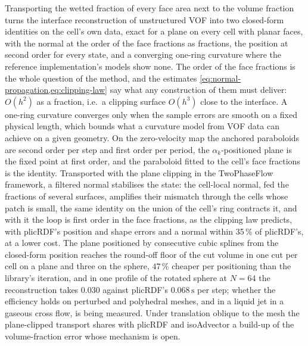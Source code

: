 \documentclass[preprint,12pt]{elsarticle}
\begin{document}
Transporting the wetted fraction of every face area next to the volume fraction turns the interface reconstruction of unstructured VOF into two closed-form identities on the cell's own data, exact for a plane on every cell with planar faces, with the normal at the order of the face fractions as fractions, the position at second order for every state, and a converging one-ring curvature where the reference implementation's models show none. The order of the face fractions is the whole question of the method, and the estimates \cref{eq:normal-propagation,eq:clipping-law} say what any construction of them must deliver: $O(h^2)$ as a fraction, i.e.\ a clipping surface $O(h^3)$ close to the interface. A one-ring curvature converges only when the sample errors are smooth on a fixed physical length, which bounds what a curvature model from VOF data can achieve on a given geometry. On the zero-velocity map the anchored paraboloids are second order per step and first order per period, the $\alpha_k$-positioned plane is the fixed point at first order, and the paraboloid fitted to the cell's face fractions is the identity. Transported with the plane clipping in the TwoPhaseFlow framework, a filtered normal stabilises the state: the cell-local normal, fed the fractions of several surfaces, amplifies their mismatch through the cells whose patch is small, the same identity on the union of the cell's ring contracts it, and with it the loop is first order in the face fractions, as the clipping law predicts, with plicRDF's position and shape errors and a normal within 35\,\% of plicRDF's, at a lower cost. The plane positioned by consecutive cubic splines from the closed-form position reaches the round-off floor of the cut volume in one cut per cell on a plane and three on the sphere, $47\,\%$ cheaper per positioning than the library's iteration, and in one profile of the rotated sphere at $N = 64$ the reconstruction takes $0.030$ against plicRDF's $0.068\,\mathrm{s}$ per step; whether the efficiency holds on perturbed and polyhedral meshes, and in a liquid jet in a gaseous cross flow, is being measured. Under translation oblique to the mesh the plane-clipped transport shares with plicRDF and isoAdvector a build-up of the volume-fraction error whose mechanism is open.
\end{document}

